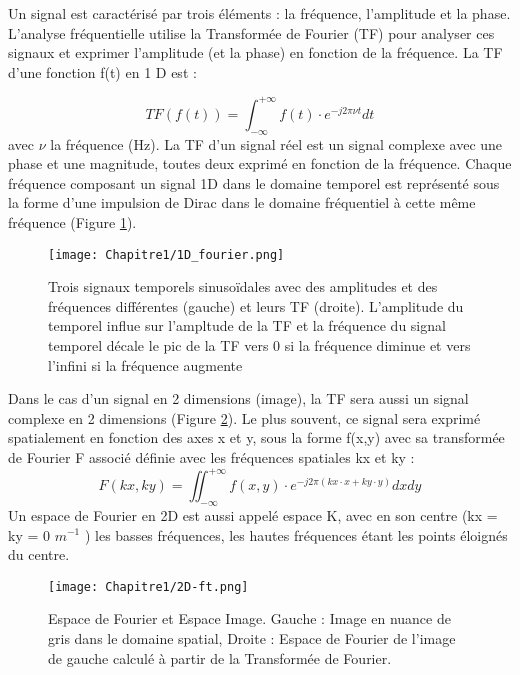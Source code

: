 Un signal est caractérisé par trois éléments : la fréquence, l’amplitude et la phase. L’analyse fréquentielle utilise la Transformée de Fourier (TF)  pour analyser ces signaux et exprimer l’amplitude (et la phase) en fonction de la fréquence.
 La TF d’une fonction f(t) en 1 D est :

 \begin{equation}
 \nonumber
  TF(f(t)) = \int_{-\infty}^{+\infty}{f(t)\cdot e^{-j2\pi \nu t}dt}
 \end{equation}
 avec $\nu$ la fréquence (Hz).
La TF d’un signal réel est un signal complexe avec une phase et une magnitude, toutes deux exprimé en fonction de la fréquence. Chaque fréquence composant un signal 1D dans le domaine temporel est représenté sous la forme d’une impulsion de Dirac dans le domaine fréquentiel à cette même fréquence (Figure \ref{fig:ft_1D}).

\begin{figure}[!htbp]
  \begin{center}
    \texttt{[image: Chapitre1/1D\_fourier.png]}
     \end{center}
    \caption{Trois signaux temporels sinusoïdales avec des amplitudes et des fréquences différentes (gauche) et leurs TF (droite). L'amplitude du temporel influe sur l'ampltude de la  TF et la fréquence du signal temporel décale le pic de la TF vers 0 si la fréquence diminue et vers l'infini si la fréquence augmente}
  \label{fig:ft_1D}
\end{figure}
\clearpage
Dans le cas d’un signal en 2 dimensions  (image),  la TF sera aussi un signal complexe en 2 dimensions (Figure \ref{fig:ft_2D}). Le plus souvent, ce signal sera exprimé spatialement en fonction des axes x et y, sous la forme f(x,y) avec sa transformée de Fourier F associé définie avec les fréquences spatiales kx et ky :
\begin{equation}
\nonumber
F(kx,ky)=\iint_{-\infty}^{+\infty}{f(x,y)\cdot e^{-j2\pi(kx\cdot x+ky\cdot y)}dxdy}
\end{equation}
Un espace de Fourier en 2D est aussi appelé espace K, avec en son centre (kx = ky = 0 $m^{-1}$ ) les basses fréquences, les hautes fréquences étant les points éloignés du centre.

\begin{figure}[!htbp]
  \begin{center}
    \texttt{[image: Chapitre1/2D-ft.png]}
     \end{center}
    \caption{Espace de Fourier et Espace Image. Gauche : Image en nuance de gris dans le domaine spatial, Droite : Espace de Fourier de l’image de gauche calculé à partir de la Transformée de Fourier.}
  \label{fig:ft_2D}
\end{figure}



